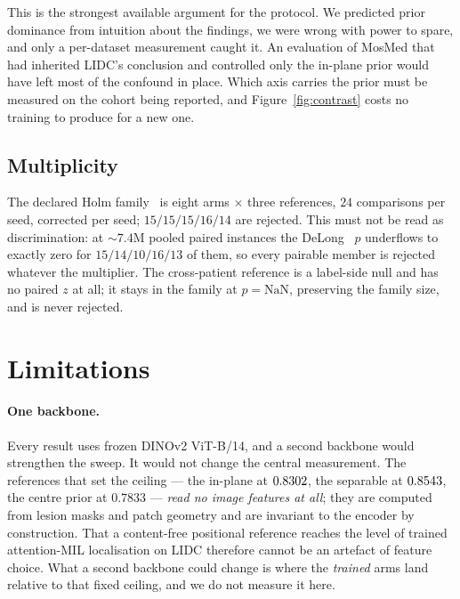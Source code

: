 \documentclass[10pt]{article}
\begin{document}
This is the strongest available argument for the protocol. We predicted prior
dominance from intuition about the findings, we were wrong with power to spare,
and only a per-dataset measurement caught it. An evaluation of MosMed that had
inherited LIDC's conclusion and controlled only the in-plane prior would have
left most of the confound in place. Which axis carries the prior must be measured
on the cohort being reported, and Figure~\ref{fig:contrast} costs no training to
produce for a new one.

\subsection{Multiplicity}

The declared Holm family~\citep{holm1979} is eight arms $\times$ three
references, $24$ comparisons per seed, corrected per seed; $15/15/15/16/14$ are
rejected. This must not be read as discrimination: at ${\sim}7.4$M pooled paired
instances the DeLong~\citep{delong1988} $p$ underflows to exactly zero for
$15/14/10/16/13$ of them, so every pairable member is rejected whatever the
multiplier. The cross-patient reference is a label-side null and has no paired
$z$ at all; it stays in the family at $p = \mathrm{NaN}$, preserving the family
size, and is never rejected.

\section{Limitations}
\label{sec:limits}

\paragraph{One backbone.} Every result uses frozen DINOv2 ViT-B/14, and a second
backbone would strengthen the sweep. It would not change the central
measurement. The references that set the ceiling --- the in-plane \maskref{} at
$0.8302$, the separable at $0.8543$, the centre prior at
$0.7833$ --- \emph{read no image features at all}; they are computed from lesion
masks and patch geometry and are invariant to the encoder by construction. That a
content-free positional reference reaches the level of trained attention-MIL
localisation on LIDC therefore cannot be an artefact of feature choice. What a
second backbone could change is where the \emph{trained} arms land relative to
that fixed ceiling, and we do not measure it here.
\end{document}
